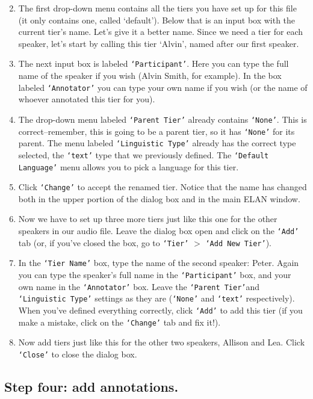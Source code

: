 \documentclass[letterpaper,12pt]{article}
\begin{document}
\begin{enumerate}
\setcounter{enumi}{1}
\item The first drop-down menu contains all the tiers you have set up for this file (it only contains one, called `default'). Below that is an input box with the current tier's name. Let's give it a better name. Since we need a tier for each speaker, let's start by calling this tier `Alvin', named after our first speaker.
\item The next input box is labeled \texttt{`Participant'}. Here you can type the full name of the speaker if you wish (Alvin Smith, for example). In the box labeled \texttt{`Annotator'} you can type your own name if you wish (or the name of whoever annotated this tier for you).
\item The drop-down menu labeled \texttt{`Parent Tier'} already contains \texttt{`None'}. This is correct--remember, this is going to be a parent tier, so it has \texttt{`None'} for its parent. The menu labeled \texttt{`Linguistic Type'} already has the correct type selected, the \texttt{`text'} type that we previously defined. The \texttt{`Default Language'} menu allows you to pick a language for this tier.
\item Click \texttt{`Change'} to accept the renamed tier. Notice that the name has changed both in the upper portion of the dialog box and in the main ELAN window.
\item Now we have to set up three more tiers just like this one for the other speakers in our audio file. Leave the dialog box open and click on the \texttt{`Add'} tab (or, if you've closed the box, go to \texttt{`Tier'} $>$ \texttt{`Add New Tier'}).
\item In the \texttt{`Tier Name'} box, type the name of the second speaker: Peter. Again you can type the speaker's full name in the \texttt{`Participant'} box, and your own name in the \texttt{`Annotator'} box. Leave the \texttt{`Parent Tier'}and \texttt{`Linguistic Type'} settings as they are (\texttt{`None'} and \texttt{`text'} respectively). When you've defined everything correctly, click \texttt{`Add'} to add this tier (if you make a mistake, click on the \texttt{`Change'} tab and fix it!).
\item Now add tiers just like this for the other two speakers, Allison and Lea. Click \texttt{`Close'} to close the dialog box.
\end{enumerate}
\subsection*{Step four: add annotations.}
\end{document}
